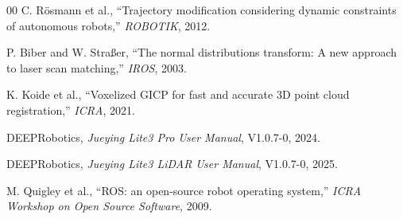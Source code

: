 \documentclass[conference]{IEEEtran}
\begin{document}
\begin{thebibliography}{00}
C. R{\"o}smann et al., ``Trajectory modification considering dynamic constraints of autonomous robots,'' \textit{ROBOTIK}, 2012.

P. Biber and W. Stra{\ss}er, ``The normal distributions transform: A new approach to laser scan matching,'' \textit{IROS}, 2003.

K. Koide et al., ``Voxelized GICP for fast and accurate 3D point cloud registration,'' \textit{ICRA}, 2021.

DEEPRobotics, \textit{Jueying Lite3 Pro User Manual}, V1.0.7-0, 2024.

DEEPRobotics, \textit{Jueying Lite3 LiDAR User Manual}, V1.0.7-0, 2025.

M. Quigley et al., ``ROS: an open-source robot operating system,'' \textit{ICRA Workshop on Open Source Software}, 2009.

\end{thebibliography}
\end{document}
